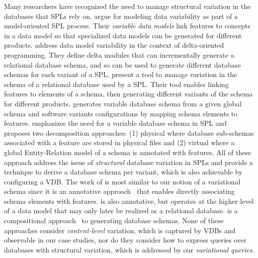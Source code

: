 Many researchers have recognized the need to manage structural variation in the
databases that SPLs rely on.
%
\cite{ad11varDataModel} argue for modeling data variability as part of a
model-oriented SPL process. Their \emph{variable data models}
link features to concepts in a data model so that specialized data models can
be generated for different products.
%
\cite{dbSchVarSPL} address data model variability in the context of
delta-oriented programming. They define delta modules that can incrementally
generate a relational database schema, and so
can be used to generate different database schemas for each variant of a SPL.
%
\cite{varMngDBapp} present a tool to manage variation in the schema
of a relational database used by a SPL. Their tool enables
linking features to elements of a schema, then generating different variants of
the schema for different products.
%
\cite{slrs12CAiSE} generates variable database schema from a given global schema and
software variants configurations by mapping schema elements to features.
%
\cite{skrhas09DBIS} emphasizes the need for a variable database schema in SPL and
proposes two decomposition approaches: (1) physical where database sub-schemas
associated with a feature are stored in physical files
and (2) virtual where a global Entity-Relation model of a schema is annotated
with features.
%
All of these approach address the issue of \emph{structural} database variation
in SPLs and provide a technique to derive a database schema per variant, 
which is also achievable by configuring a VDB. 
%
The work of \cite{varMngDBapp} is most similar to our notion of a
variational schema since it is an annotative approach~\cite{KAK08} that enables
directly associating schema elements with features. \cite{ad11varDataModel}
is also annotative, but operates at the higher level of a data model that may
only later be realized as a relational database. \cite{dbSchVarSPL} is a
compositional approach~\cite{KAK08} to generating database schemas.
%
None of these approaches consider \emph{content-level} variation, which is
captured by VDBs and observable in our case studies, nor do they consider how
to express queries over databases with structural variation, which is addressed
by our \emph{variational queries}.



